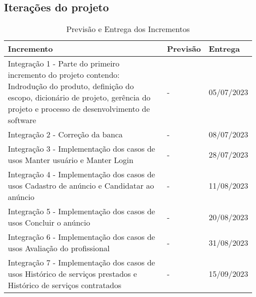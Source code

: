 \subsection{Iterações do projeto}

\begin{table}[htb]
    \centering
    \caption{Previsão e Entrega dos Incrementos}
    \label{tab:previsao-entrega-incrementos}
    \begin{tabular}{|p{8cm}|p{2cm}|p{2cm}|}
    \hline
    \textbf{Incremento} & \textbf{Previsão} & \textbf{Entrega}  \\ \hline
    Integração 1 - Parte do primeiro incremento do projeto contendo: Indrodução do produto, definição do escopo, dicionário de projeto, gerência do projeto e processo de desenvolvimento de software & - & 05/07/2023  \\ \hline
    Integração 2 - Correção da banca & - & 08/07/2023 \\ \hline
    Integração 3 - Implementação dos casos de usos Manter usuário e Manter Login & - & 28/07/2023 \\ \hline
    Integração 4 - Implementação dos casos de usos Cadastro de anúncio e Candidatar ao anúncio & - & 11/08/2023 \\ \hline
    Integração 5 - Implementação dos casos de usos Concluir o anúncio & - & 20/08/2023 \\ \hline
    Integração 6 - Implementação dos casos de usos Avaliação do profissional & - & 31/08/2023 \\ \hline
    Integração 7 - Implementação dos casos de usos Histórico de serviços prestados e Histórico de serviços contratados & - & 15/09/2023 \\ \hline
    \end{tabular}
\end{table}
    
    
    